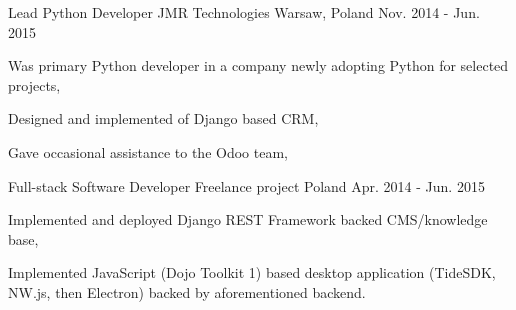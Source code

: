 \begin{cventries}
    \cventry
    {Lead Python Developer} %
    {JMR Technologies} %
    {Warsaw, Poland} %
    {Nov. 2014 - Jun. 2015} %
    {
        \begin{cvitems} %
            \item {Was primary Python developer in a company newly adopting Python for selected projects,}
            \item {Designed and implemented of Django based CRM,}
            \item {Gave occasional assistance to the Odoo team,}
        \end{cvitems}
    }

    \cventry
    {Full-stack Software Developer} %
    {Freelance project} %
    {Poland} %
    {Apr. 2014 - Jun. 2015} %
    {
        \begin{cvitems} %
            \item {Implemented and deployed Django REST Framework backed CMS/knowledge base,}
            \item {Implemented JavaScript (Dojo Toolkit 1) based desktop application (TideSDK, NW.js, then Electron) backed by aforementioned backend.}
        \end{cvitems}
    }


\end{cventries}
